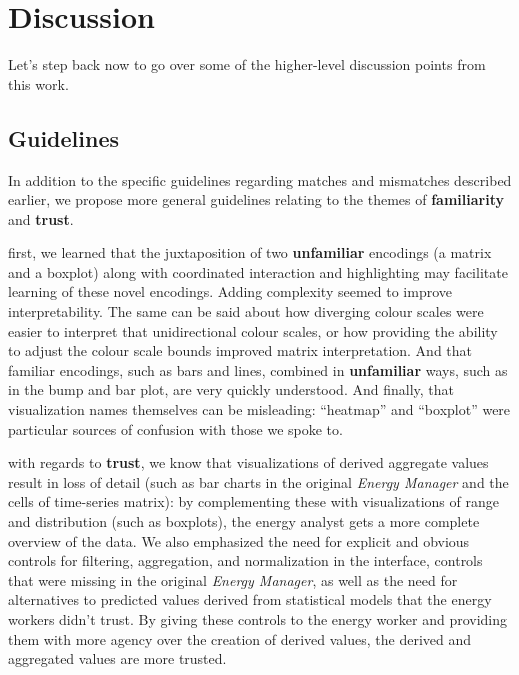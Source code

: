 \documentclass[journal]{vgtc}                %
\newcommand{\bstart}[1]{\vspace{1mm} \noindent{\textbf{#1:}}}
\begin{document}

\section{Discussion}
\label{discussion}


Let's step back now to go over some of the higher-level discussion points from this work.


\subsection{Guidelines}
\label{discussion-guidelines}


In addition to the specific guidelines regarding matches and mismatches described earlier, we propose more general guidelines relating to the themes of {\bf familiarity} and {\bf trust}.

\bstart{Familiarity} first, we learned that the juxtaposition of two {\bf unfamiliar} encodings (a matrix and a boxplot) along with coordinated interaction and highlighting may facilitate learning of these novel encodings. 
Adding complexity seemed to improve interpretability. 
The same can be said about how diverging colour scales were easier to interpret that unidirectional colour scales, or how providing the ability to adjust the colour scale bounds improved matrix interpretation.
And that familiar encodings, such as bars and lines, combined in {\bf unfamiliar} ways, such as in the bump and bar plot, are very quickly understood.
And finally, that visualization names themselves can be misleading: ``heatmap'' and ``boxplot'' were particular sources of confusion with those we spoke to.

\bstart{Trust} with regards to {\bf trust}, we know that visualizations of derived aggregate values result in loss of detail (such as bar charts in the original {\it Energy Manager} and the cells of time-series matrix): by complementing these with visualizations of range and distribution (such as boxplots), the energy analyst gets a more complete overview of the data.
We also emphasized the need for explicit and obvious controls for filtering, aggregation, and normalization in the interface, controls that were missing in the original {\it Energy Manager}, as well as the need for alternatives to predicted values derived from statistical models that the energy workers didn't trust. 
By giving these controls to the energy worker and providing them with more agency over the creation of derived values, the derived and aggregated values are more trusted. 
\end{document}
